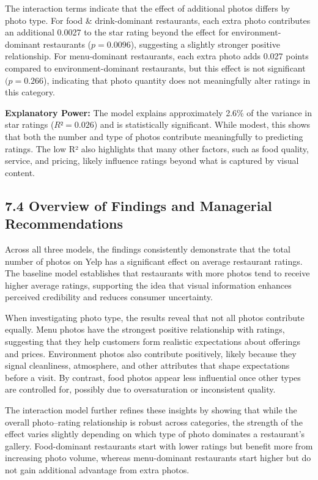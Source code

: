 \documentclass[
]{article}
\begin{document}
The interaction terms indicate that the effect of additional photos
differs by photo type. For food \& drink-dominant restaurants, each
extra photo contributes an additional 0.0027 to the star rating beyond
the effect for environment-dominant restaurants (\(p = 0.0096\)),
suggesting a slightly stronger positive relationship. For menu-dominant
restaurants, each extra photo adds 0.027 points compared to
environment-dominant restaurants, but this effect is not significant
\((p = 0.266\)), indicating that photo quantity does not meaningfully
alter ratings in this category.

\textbf{Explanatory Power:} The model explains approximately 2.6\% of
the variance in star ratings (\(R² = 0.026\)) and is statistically
significant. While modest, this shows that both the number and type of
photos contribute meaningfully to predicting ratings. The low R² also
highlights that many other factors, such as food quality, service, and
pricing, likely influence ratings beyond what is captured by visual
content.

\subsection{7.4 Overview of Findings and Managerial
Recommendations}\label{overview-of-findings-and-managerial-recommendations}

Across all three models, the findings consistently demonstrate that the
total number of photos on Yelp has a significant effect on average
restaurant ratings. The baseline model establishes that restaurants with
more photos tend to receive higher average ratings, supporting the idea
that visual information enhances perceived credibility and reduces
consumer uncertainty.

When investigating photo type, the results reveal that not all photos
contribute equally. Menu photos have the strongest positive relationship
with ratings, suggesting that they help customers form realistic
expectations about offerings and prices. Environment photos also
contribute positively, likely because they signal cleanliness,
atmosphere, and other attributes that shape expectations before a visit.
By contrast, food photos appear less influential once other types are
controlled for, possibly due to oversaturation or inconsistent quality.

The interaction model further refines these insights by showing that
while the overall photo--rating relationship is robust across
categories, the strength of the effect varies slightly depending on
which type of photo dominates a restaurant's gallery. Food-dominant
restaurants start with lower ratings but benefit more from increasing
photo volume, whereas menu-dominant restaurants start higher but do not
gain additional advantage from extra photos.
\end{document}
